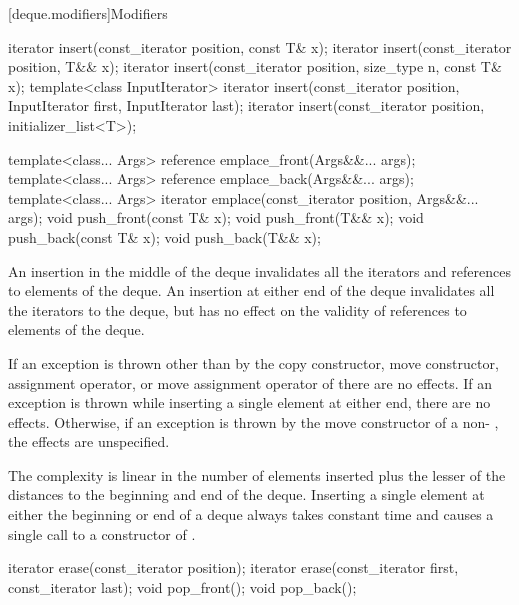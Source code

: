 [deque.modifiers]{Modifiers}

%
%
%
%
\begin{itemdecl}
iterator insert(const_iterator position, const T& x);
iterator insert(const_iterator position, T&& x);
iterator insert(const_iterator position, size_type n, const T& x);
template<class InputIterator>
  iterator insert(const_iterator position,
                  InputIterator first, InputIterator last);
iterator insert(const_iterator position, initializer_list<T>);

template<class... Args> reference emplace_front(Args&&... args);
template<class... Args> reference emplace_back(Args&&... args);
template<class... Args> iterator emplace(const_iterator position, Args&&... args);
void push_front(const T& x);
void push_front(T&& x);
void push_back(const T& x);
void push_back(T&& x);
\end{itemdecl}

\begin{itemdescr}
\pnum
\effects
An insertion in the middle of the deque invalidates all the iterators and
references to elements of the deque.
An insertion at either end of the
deque invalidates all the iterators to the deque, but has no effect on
the validity of references to elements of the deque.

\pnum
\remarks
If an exception is thrown other than by the
copy constructor, move constructor,
assignment operator, or move assignment operator of
there are no effects.
If an exception is thrown while inserting a single element at either end,
there are no effects.
Otherwise, if an exception is thrown by the move constructor of a
non-
, the effects are unspecified.

\pnum
\complexity
The complexity is linear in the number of elements inserted plus the lesser
of the distances to the beginning and end of the deque.
Inserting a single element at either the beginning or end of a deque always takes constant time
and causes a single call to a constructor of
.
\end{itemdescr}

%
\begin{itemdecl}
iterator erase(const_iterator position);
iterator erase(const_iterator first, const_iterator last);
void pop_front();
void pop_back();
\end{itemdecl}

